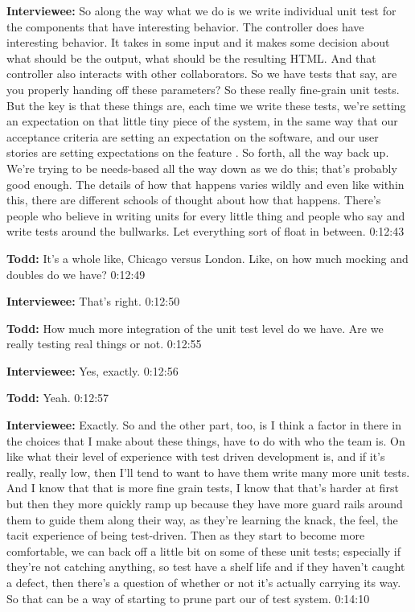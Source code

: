 \textbf{Interviewee:} So along the way what we do is we write individual unit test for the components that have interesting behavior.  The controller does have interesting behavior.  It takes in some input and it makes some decision about what should be the output, what should be the resulting HTML.  And that controller also interacts with other collaborators.  So we have tests that say, are you properly handing off these parameters?  So these really fine-grain unit tests. But the key is that these things are, each time we write these tests, we're setting an expectation on that little tiny piece of the system, in the same way that our acceptance criteria are setting an expectation on the software, and our user stories are setting expectations on the feature .  So forth, all the way back up. We're trying to be needs-based  all the way down as we do this; that's probably good enough.  The details of how that happens varies wildly and even like within this, there are different schools of thought about how that happens.  There's people who believe in writing units for every little thing and people who say  and write tests around the bullwarks.  Let everything sort of float in between.  0:12:43

\textbf{Todd:}  	It's a whole like, Chicago versus London.  Like, on how much mocking and doubles do we have?  0:12:49

\textbf{Interviewee:}  	That's right.  0:12:50

\textbf{Todd:}  	How much more integration of the unit test level do we have.  Are we really testing real things or not.  0:12:55

\textbf{Interviewee:}  	Yes, exactly.  0:12:56

\textbf{Todd:}  	Yeah.  0:12:57

\textbf{Interviewee:}  	Exactly.  So and the other part, too, is I think a factor in there in the choices that I make about these things, have to do with who the team is.  On like what their level of experience with test driven development is, and if it's really, really low, then I'll tend to want to have them write many more unit tests.  And I know that that is more fine grain tests, I know that that's harder at first but then they more quickly ramp up because they have more guard rails around them to guide them along their way, as they're learning the knack, the feel, the tacit experience of being test-driven.  Then as they start to become more comfortable, we can back off a little bit on some of these unit tests; especially if they're not catching anything, so test have a shelf life and if they haven't caught a defect, then there's a question of whether or not it's actually carrying its way.  So that can be a way of starting to prune part our of test system.  0:14:10

